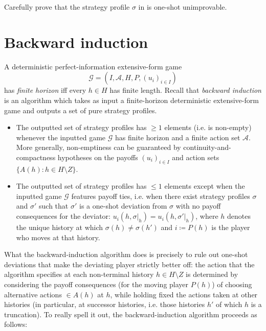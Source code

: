\begin{exercise}
	\label{exercise:rubinstein_osd}
	Carefully prove that the strategy profile $\sigma$ in  is one-shot unimprovable.
\end{exercise}




\section{Backward induction}
\label{osdp:backward}

A deterministic perfect-information extensive-form game
%
\begin{equation*}
	\mathcal{G}
	= (I,\mathcal{A},H,P,(u_i)_{i \in I}) 
\end{equation*}
%
has \emph{finite horizon} iff every $h \in H$ has finite length. Recall that \emph{backward induction} is an algorithm which takes as input a finite-horizon deterministic extensive-form game and outputs a set of pure strategy profiles. 

\begin{itemize}

	\item The outputted set of strategy profiles has $\geq 1$ elements (i.e. is non-empty) whenever the inputted game $\mathcal{G}$ has finite horizon and a finite action set $\mathcal{A}$. More generally, non-emptiness can be guaranteed by continuity-and-compactness hypotheses on the payoffs $(u_i)_{i \in I}$ and action sets $\{ A(h) : h \in H \setminus Z \}$.

	\item The outputted set of strategy profiles has $\leq 1$ elements except when the inputted game $\mathcal{G}$ features payoff ties, i.e. when there exist strategy profiles $\sigma$ and $\sigma'$ such that $\sigma'$ is a one-shot deviation from $\sigma$ with no payoff consequences for the deviator: $u_i(h,\sigma|_h) = u_i(h,\sigma'|_h)$, where $h$ denotes the unique history at which $\sigma(h) \neq \sigma(h')$ and $i \coloneqq P(h)$ is the player who moves at that history.

\end{itemize}

What the backward-induction algorithm does is precisely to rule out one-shot deviations that make the deviating player strictly better off: the action that the algorithm specifies at each non-terminal history $h \in H \setminus Z$ is determined by considering the payoff consequences (for the moving player $P(h)$) of choosing alternative actions $\in A(h)$ at $h$, while holding fixed the actions taken at other histories (in particular, at successor histories, i.e. those histories $h'$ of which $h$ is a truncation). To really spell it out, the backward-induction algorithm proceeds as follows:

